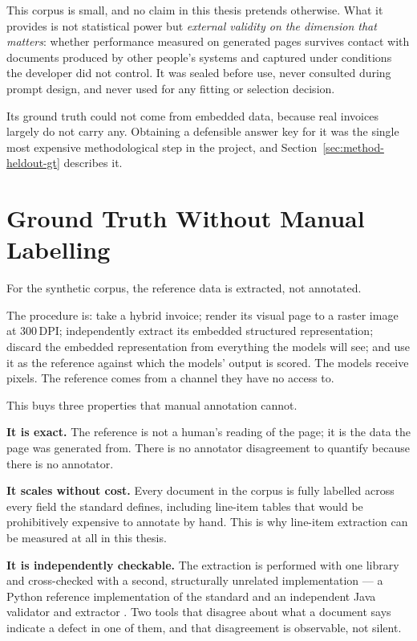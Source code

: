 This corpus is small, and no claim in this thesis pretends otherwise. What it provides is not
statistical power but \emph{external validity on the dimension that matters}: whether
performance measured on generated pages survives contact with documents produced by other
people's systems and captured under conditions the developer did not control. It was sealed
before use, never consulted during prompt design, and never used for any fitting or selection
decision.

Its ground truth could not come from embedded data, because real invoices largely do not carry
any. Obtaining a defensible answer key for it was the single most expensive methodological
step in the project, and Section~\ref{sec:method-heldout-gt} describes it.

\section{Ground Truth Without Manual Labelling}
\label{sec:method-gt}

For the synthetic corpus, the reference data is extracted, not annotated.

The procedure is: take a hybrid invoice; render its visual page to a raster image at
300\,\ac{DPI}; independently extract its embedded structured representation; discard the
embedded representation from everything the models will see; and use it as the reference
against which the models' output is scored. The models receive pixels. The reference comes
from a channel they have no access to.

This buys three properties that manual annotation cannot.

\textbf{It is exact.} The reference is not a human's reading of the page; it is the data the
page was generated from. There is no annotator disagreement to quantify because there is no
annotator.

\textbf{It scales without cost.} Every document in the corpus is fully labelled across every
field the standard defines, including line-item tables that would be prohibitively expensive
to annotate by hand. This is why line-item extraction can be measured at all in this thesis.

\textbf{It is independently checkable.} The extraction is performed with one library and
cross-checked with a second, structurally unrelated implementation --- a Python reference
implementation of the standard \parencite{facturxpython} and an independent Java validator and
extractor \parencite{mustangproject}. Two tools that disagree about what a document says indicate a
defect in one of them, and that disagreement is observable, not silent.

